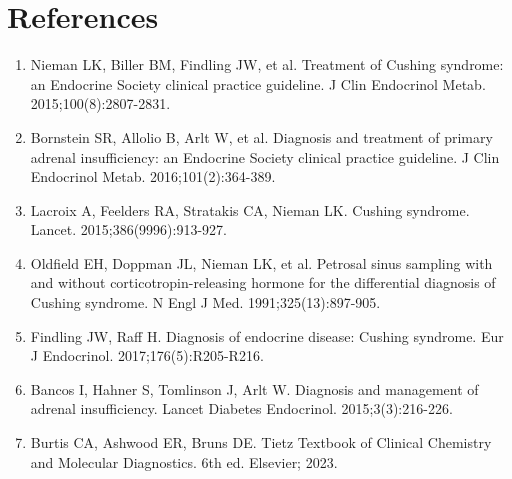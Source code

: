 \section*{References}
\begin{enumerate}
  \item Nieman LK, Biller BM, Findling JW, et al. Treatment of Cushing syndrome: an Endocrine Society clinical practice guideline. J Clin Endocrinol Metab. 2015;100(8):2807-2831.
  \item Bornstein SR, Allolio B, Arlt W, et al. Diagnosis and treatment of primary adrenal insufficiency: an Endocrine Society clinical practice guideline. J Clin Endocrinol Metab. 2016;101(2):364-389.
  \item Lacroix A, Feelders RA, Stratakis CA, Nieman LK. Cushing syndrome. Lancet. 2015;386(9996):913-927.
  \item Oldfield EH, Doppman JL, Nieman LK, et al. Petrosal sinus sampling with and without corticotropin-releasing hormone for the differential diagnosis of Cushing syndrome. N Engl J Med. 1991;325(13):897-905.
  \item Findling JW, Raff H. Diagnosis of endocrine disease: Cushing syndrome. Eur J Endocrinol. 2017;176(5):R205-R216.
  \item Bancos I, Hahner S, Tomlinson J, Arlt W. Diagnosis and management of adrenal insufficiency. Lancet Diabetes Endocrinol. 2015;3(3):216-226.
  \item Burtis CA, Ashwood ER, Bruns DE. Tietz Textbook of Clinical Chemistry and Molecular Diagnostics. 6th ed. Elsevier; 2023.
\end{enumerate}

\clearpage
